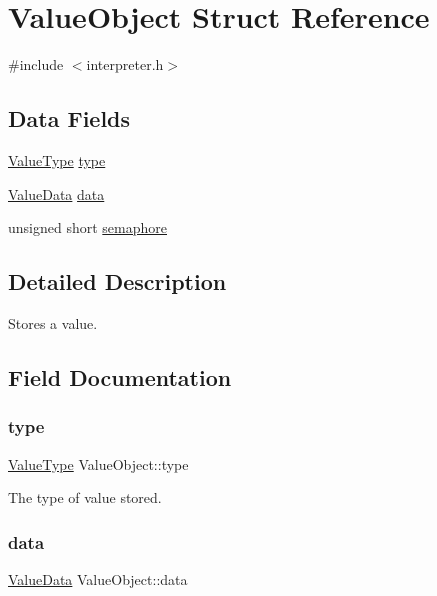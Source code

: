 \hypertarget{struct_value_object}{}\section{Value\+Object Struct Reference}
\label{struct_value_object}


{\ttfamily \#include $<$interpreter.\+h$>$}

\subsection*{Data Fields}
\begin{DoxyCompactItemize}
\item 
\hyperlink{interpreter_8h_ad9971b6ef33e02ba2c75d19c1d2518a1}{Value\+Type} \hyperlink{struct_value_object_ad2d5ae1b91e2d7bbe9f262f0e8889b8d}{type}
\item 
\hyperlink{union_value_data}{Value\+Data} \hyperlink{struct_value_object_a66e5eb0433f8150bf24cfc86856efe4e}{data}
\item 
unsigned short \hyperlink{struct_value_object_a08cfa02ff5b2f4ee7307c62c95089373}{semaphore}
\end{DoxyCompactItemize}


\subsection{Detailed Description}
Stores a value. 

\subsection{Field Documentation}
\mbox{\label{struct_value_object_ad2d5ae1b91e2d7bbe9f262f0e8889b8d}} 
\subsubsection{\texorpdfstring{type}{type}}
{\footnotesize\ttfamily \hyperlink{interpreter_8h_ad9971b6ef33e02ba2c75d19c1d2518a1}{Value\+Type} Value\+Object\+::type}

The type of value stored. \mbox{\label{struct_value_object_a66e5eb0433f8150bf24cfc86856efe4e}} 
\subsubsection{\texorpdfstring{data}{data}}
{\footnotesize\ttfamily \hyperlink{union_value_data}{Value\+Data} Value\+Object\+::data}

